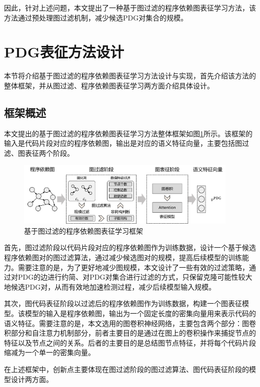 因此，针对上述问题，本文提出了一种基于图过滤的程序依赖图表征学习方法，该方法通过预处理图过滤机制，减少候选PDG对集合的规模。

\section{PDG表征方法设计}
\label{sec:PDG}
本节将介绍基于图过滤的程序依赖图表征学习方法设计与实现，首先介绍该方法的整体框架，并从图过滤、程序依赖图表征学习两方面介绍具体设计。 

\subsection{框架概述}
\label{subsec:PDGOverview}
本文提出的基于图过滤的程序依赖图表征学习方法整体框架如图\ref{fig:pdgframework}所示。该框架的输入是代码片段对应的程序依赖图，输出是对应的语义特征向量，主要包括图过滤、图表征两个阶段。

\begin{figure}[H]
  \centering
  \includegraphics[width=0.95\textwidth]{figures/pdgframework.png}
  \caption{基于图过滤的程序依赖图表征学习框架}\label{fig:pdgframework}
\end{figure}

首先，图过滤阶段以代码片段对应的程序依赖图作为训练数据，设计一个基于候选程序依赖图对的图过滤算法，通过减少候选图对的规模，提高后续模型的训练能力。需要注意的是，为了更好地减少图规模，本文设计了一些有效的过滤策略，通过对PDG的边进行约简、对PDG对集合进行过滤的方式，只保留克隆可能性较大地候选PDG对，从而有效地加速检测过程，减少后续模型输入规模。

其次，图代码表征阶段以过滤后的程序依赖图作为训练数据，构建一个图表征模型。该模型的输入是程序依赖图，输出为一个固定长度的密集向量用来表示代码的语义特征。需要注意的是，本文选用的图卷积神经网络，主要包含两个部分：图卷积部分和自注意力机制部分，前者主要目的是通过在图上的卷积操作来捕捉节点的特征以及节点之间的关系。后者的主要目的是总结图节点特征，并将每个代码片段缩减为一个单一的密集向量。

在上述框架中，创新点主要体现在图过滤阶段的图过滤算法、图代码表征阶段的模型设计两方面。


